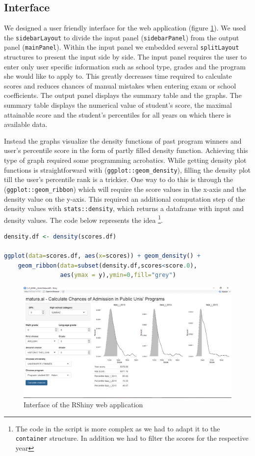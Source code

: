 \documentclass{article}
\begin{document}
\subsection{Interface}
We designed a user friendly interface for the web application (figure \ref{fig:shiny-interface}). We used the \texttt{sidebarLayout} to divide the input panel (\texttt{sidebarPanel}) from the output panel (\texttt{mainPanel}). Within the input panel we embedded several \texttt{splitLayout} structures to present the input side by side. The input panel requires the user to enter only user specific information such as school type, grades and the program she would like to apply to. This greatly decreases time required to calculate scores and reduces chances of manual mistakes when entering exam or school coefficients. The output panel displays the summary table and the graphs. The summary table displays the numerical value of student's score, the maximal attainable score and the student's percentiles for all years on which there is available data.

Instead the graphs visualize the density functions of past program winners and user's percentile score in the form of partly filled density function. Achieving this type of graph required some programming acrobatics. While getting density plot functions is straightforward with (\texttt{ggplot::geom\_density}), filling the density plot till the user's percentile rank is a trickier. One way to do this is through the (\texttt{ggplot::geom\_ribbon}) which will require the score values in the x-axis and the density value on the y-axis. This required an additional computation step of the density values with \texttt{stats::density}, which returns a dataframe with input and density values. The code below represents the idea \footnote{The code in the script is more complex as we had to adapt it to the \texttt{container} structure. In addition we had to filter the scores for the respective year}. 
 \begin{lstlisting}[language=R]
density.df <- density(scores.df) 
 
ggplot(data=scores.df, aes(x=scores)) + geom_density() + 
	geom_ribbon(data=subset(density.df,scores<score.0),
				aes(ymax = y),ymin=0,fill="grey")
\end{lstlisting}

\begin{figure}[h]
	\caption{Interface of the RShiny web application}
	\label{fig:shiny-interface}
	\centering
	\includegraphics[width=\textwidth]{../Figures/shiny_1.png}	
\end{figure}
\end{document}
